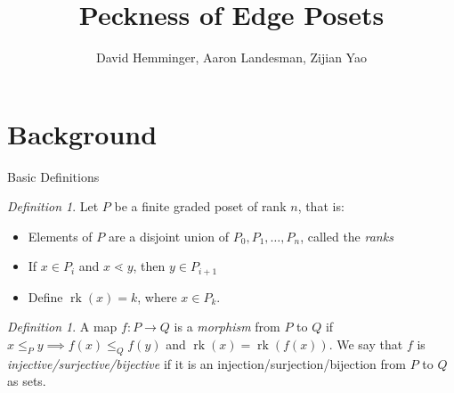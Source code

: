 \documentclass{beamer}
\title{Peckness of Edge Posets}
\author{David Hemminger, Aaron Landesman, Zijian Yao}
\theoremstyle{remark}
\newtheorem{defn}[thm]{Definition}
\newcommand\rk{\operatorname{rk}}
\begin{document}
\begin{frame}
	\titlepage
\end{frame}


\section{Background}






\begin{frame}{Basic Definitions}
\begin{defn}
Let $P$ be a finite graded poset of rank $n$, that is:
\begin{itemize}
\item Elements of $P$ are a disjoint union of $P_0,P_1,\ldots,P_n$, called the \textit{ranks}
\item If $x\in P_i$ and $x\lessdot y$, then $y\in P_{i+1}$
\item Define $\rk(x) = k$, where $x\in P_k$.
\end{itemize}
\end{defn}

\begin{defn}
A map $f\colon P\rightarrow Q$ is a \textit{morphism} from $P$ to $Q$ if $x\le_P y \implies f(x)\le_Q f(y)$ and $\rk(x) = \rk(f(x))$.  We say that $f$ is \textit{injective/surjective/bijective} if it is an injection/surjection/bijection from $P$ to $Q$ as sets.
\end{defn}
\end{frame}
\end{document}
